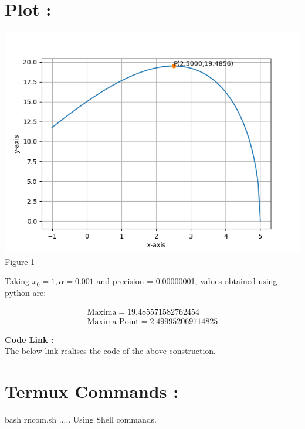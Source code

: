 \documentclass[10pt,a4paper]{report}
\begin{document}
\begin{multicols}{2}
\section{Plot :}
\begin{center}
  \includegraphics[scale=0.55]{optimization.png}
  Figure-1
  \end{center}



Taking $x_0=1,\alpha=0.001$ and precision = 0.00000001, values obtained using python are:
    
    \begin{align}
        \boxed{\text{Maxima} = 19.485571582762454}\\
        \boxed{\text{Maxima Point} = 2.499952069714825}
    \end{align}
    
\raggedright \textbf{Code Link :}\\ \vspace{2mm}
The below link realises the code of the above construction.\\
\begin{center}
\end{center}


\section{Termux Commands :}
\centering bash rncom.sh ..... Using Shell commands.

\end{multicols}
\end{document}
